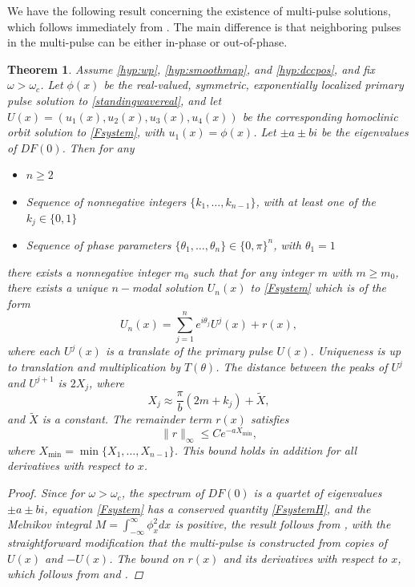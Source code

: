 \documentclass[12pt]{article}
\newtheorem{theorem}{Theorem}
\begin{document}
We have the following result concerning the existence of multi-pulse solutions, which follows immediately from \cite[Theorem~3.6]{SandstedeStrut}. The main difference is that neighboring pulses in the multi-pulse can be either in-phase or out-of-phase. 

\begin{theorem}\label{theorem:multiexist}
Assume \cref{hyp:wp}, \cref{hyp:smoothmap}, and \cref{hyp:dccpos}, and fix $\omega > \omega_c$. Let $\phi(x)$ be the real-valued, symmetric, exponentially localized primary pulse solution to \cref{standingwavereal}, and let $U(x) = (u_1(x), u_2(x), u_3(x), u_4(x))$ be the corresponding homoclinic orbit solution to \cref{Fsystem}, with $u_1(x) = \phi(x)$. Let $\pm a \pm bi$ be the eigenvalues of $DF(0)$. Then for any 
\begin{itemize}
\item $n \geq 2$
\item Sequence of nonnegative integers $\{ k_1, \dots, k_{n-1} \}$, with at least one of the $k_j \in \{0, 1 \}$
\item Sequence of phase parameters $\{ \theta_1, \dots, \theta_n \} \in \{0, \pi \}^n$, with $\theta_1 = 1$
\end{itemize}
there exists a nonnegative integer $m_0$ such that for any integer $m$ with $m \geq m_0$, there exists a unique $n-$modal solution $U_n(x)$ to \cref{Fsystem} which is of the form
  \begin{equation}\label{qn}
  U_n(x) = \sum_{j = 1}^{n} e^{i \theta_j } U^j(x) + r(x),
  \end{equation}
  where each $U^j(x)$ is a translate of the primary pulse $U(x)$. Uniqueness is up to translation and multiplication by $T(\theta)$. The distance between the peaks of $U^j$ and $U^{j+1}$ is $2 X_j$, where
  \begin{equation*}
  X_j \approx \frac{\pi}{b}(2 m + k_j) + \tilde{X},
  \end{equation*}
  and $\tilde{X}$ is a constant. The remainder term $r(x)$ satisfies
  \begin{equation}\label{rbound}
  \|r\|_\infty \leq C e^{-a X_{\mathrm{min}}},
  \end{equation}
  where $X_{\mathrm{min}} = \min\{X_1, \dots, X_{n-1}\}$. This bound holds in addition for all derivatives with respect to $x$.
\begin{proof}
Since for $\omega > \omega_c$, the spectrum of $DF(0)$ is a quartet of eigenvalues $\pm a \pm b i$, equation \cref{Fsystem} has a conserved quantity \cref{FsystemH}, and the Melnikov integral $M = \int_{-\infty}^\infty \phi_x^2 dx$ is positive, the result follows from \cite[Theorem~3.6]{SandstedeStrut}, with the straightforward modification that the multi-pulse is constructed from copies of $U(x)$ and $-U(x)$. The bound on $r(x)$ and its derivatives with respect to $x$, which follows from \cite{Sandstede1993} and \cite{Sandstede1998}.
\end{proof}
\end{theorem}
\end{document}
